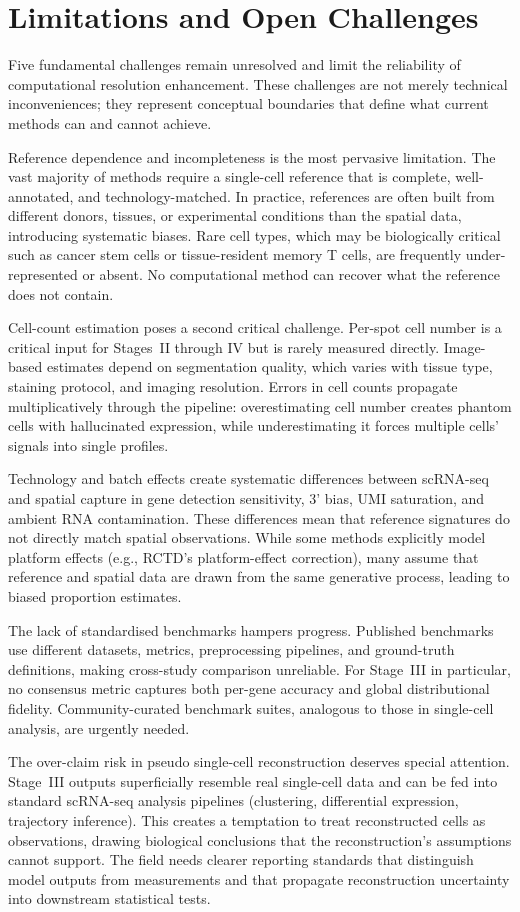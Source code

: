 \section{Limitations and Open Challenges}
\label{sec:limitations}

Five fundamental challenges remain unresolved and limit the reliability of computational resolution enhancement. These challenges are not merely technical inconveniences; they represent conceptual boundaries that define what current methods can and cannot achieve.

Reference dependence and incompleteness is the most pervasive limitation. The vast majority of methods require a single-cell reference that is complete, well-annotated, and technology-matched. In practice, references are often built from different donors, tissues, or experimental conditions than the spatial data, introducing systematic biases. Rare cell types, which may be biologically critical such as cancer stem cells or tissue-resident memory T cells, are frequently under-represented or absent. No computational method can recover what the reference does not contain.

Cell-count estimation poses a second critical challenge. Per-spot cell number is a critical input for Stages~II through IV but is rarely measured directly. Image-based estimates depend on segmentation quality, which varies with tissue type, staining protocol, and imaging resolution. Errors in cell counts propagate multiplicatively through the pipeline: overestimating cell number creates phantom cells with hallucinated expression, while underestimating it forces multiple cells' signals into single profiles.

Technology and batch effects create systematic differences between scRNA-seq and spatial capture in gene detection sensitivity, 3' bias, UMI saturation, and ambient RNA contamination. These differences mean that reference signatures do not directly match spatial observations. While some methods explicitly model platform effects (e.g., RCTD's platform-effect correction), many assume that reference and spatial data are drawn from the same generative process, leading to biased proportion estimates.

The lack of standardised benchmarks hampers progress. Published benchmarks use different datasets, metrics, preprocessing pipelines, and ground-truth definitions, making cross-study comparison unreliable. For Stage~III in particular, no consensus metric captures both per-gene accuracy and global distributional fidelity. Community-curated benchmark suites, analogous to those in single-cell analysis, are urgently needed.

The over-claim risk in pseudo single-cell reconstruction deserves special attention. Stage~III outputs superficially resemble real single-cell data and can be fed into standard scRNA-seq analysis pipelines (clustering, differential expression, trajectory inference). This creates a temptation to treat reconstructed cells as observations, drawing biological conclusions that the reconstruction's assumptions cannot support. The field needs clearer reporting standards that distinguish model outputs from measurements and that propagate reconstruction uncertainty into downstream statistical tests.
